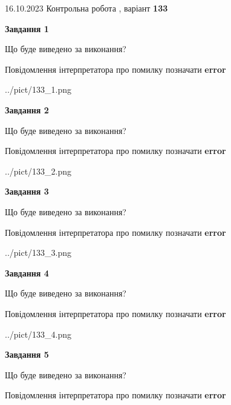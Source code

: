 \documentclass[12pt, ukrainian]{article}
\begin{document}
{\Large{16.10.2023 Контрольна робота , варіант  \No \textbf { 133 }\par}}
{
\begin {large}
{\begin {center}\textbf{Завдання 1}\end {center}}\par
Що буде виведено за виконання? \par
Повідомлення інтерпретатора про помилку позначати \textbf{error}

\begin{center}
	{../pict/133_1.png}
\end{center}
\newpage

{\begin {center}\textbf{Завдання 2}\end {center}}\par
Що буде виведено за виконання? \par
Повідомлення інтерпретатора про помилку позначати \textbf{error}

\begin{center}
	{../pict/133_2.png}
\end{center}
\newpage

{\begin {center}\textbf{Завдання 3}\end {center}}\par
Що буде виведено за виконання? \par
Повідомлення інтерпретатора про помилку позначати \textbf{error}

\begin{center}
	{../pict/133_3.png}
\end{center}
\newpage

{\begin {center}\textbf{Завдання 4}\end {center}}\par
Що буде виведено за виконання? \par
Повідомлення інтерпретатора про помилку позначати \textbf{error}

\begin{center}
	{../pict/133_4.png}
\end{center}
\newpage

{\begin {center}\textbf{Завдання 5}\end {center}}\par
Що буде виведено за виконання? \par
Повідомлення інтерпретатора про помилку позначати \textbf{error}


\end{large}}
\end{document}
